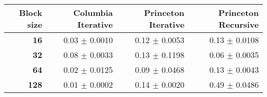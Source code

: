 \begin{tabular}{rrrr}\toprule
\textbf{Block size}  & \textbf{Columbia Iterative} & \textbf{Princeton Iterative} & \textbf{Princeton Recursive}\\\midrule
\textbf{16}  & 0.03 $\pm$ 0.0010 & 0.12 $\pm$ 0.0053 & 0.13 $\pm$ 0.0108\\
\textbf{32}  & 0.08 $\pm$ 0.0033 & 0.13 $\pm$ 0.1198 & 0.06 $\pm$ 0.0035\\
\textbf{64}  & 0.02 $\pm$ 0.0125 & 0.09 $\pm$ 0.0468 & 0.13 $\pm$ 0.0043\\
\textbf{128} & 0.01 $\pm$ 0.0002 & 0.14 $\pm$ 0.0020 & 0.49 $\pm$ 0.0486\\
\bottomrule
\end{tabular}
